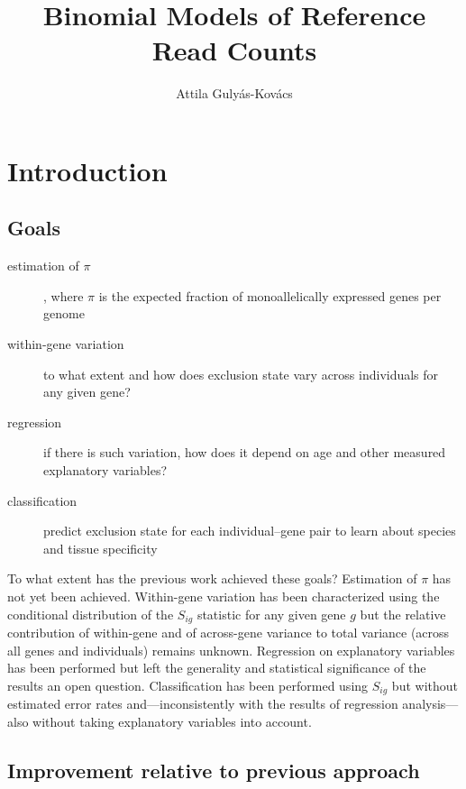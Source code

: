\documentclass[letterpaper]{article}
\title{Binomial Models of Reference Read Counts}
\author{Attila Gulyás-Kovács}
\begin{document}
\maketitle

\section{Introduction}

\subsection{Goals}

\begin{description}
\item[estimation of \(\pi\)], where \(\pi\) is the expected fraction of monoallelically
expressed genes per genome
\item[within-gene variation] to what extent and how does exclusion state vary across
individuals for any given gene?
\item[regression] if there is such variation, how does it depend on age and
other measured explanatory variables?
\item[classification] predict exclusion state for each individual--gene pair
to learn about species and tissue specificity
\end{description}

To what extent has the previous work achieved these goals?  Estimation of
\(\pi\) has not yet been achieved.  Within-gene variation has been
characterized using the conditional distribution of the \(S_{ig}\) statistic
for any given gene \(g\) but the relative contribution of within-gene and of
across-gene variance to total variance (across all genes and individuals)
remains unknown.  Regression on explanatory variables has been performed but
left the generality and statistical significance of the results an open
question.  Classification has been performed using \(S_{ig}\) but without
estimated error rates and---inconsistently with the results of regression
analysis---also without taking explanatory variables into account.

\subsection{Improvement relative to previous approach}
\label{sec:improvement}
\end{document}
